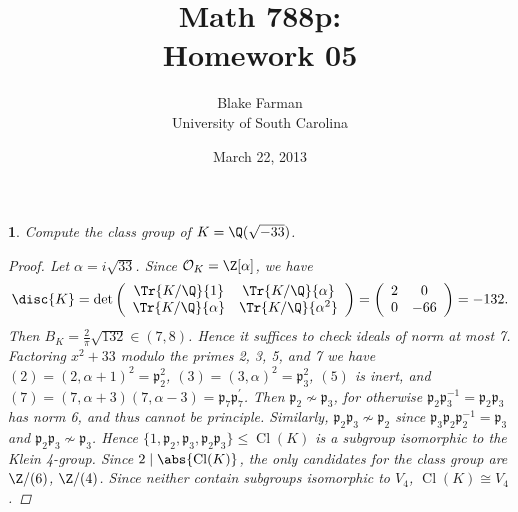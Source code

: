\documentclass[10pt]{amsart}
\author{Blake Farman\\University of South Carolina}
\title{Math 788p:\\Homework 05}
\date{March 22, 2013}
\begin{document}
\maketitle

\providecommand{\p}{\mathfrak{p}}
\providecommand{\m}{\mathfrak{m}}
\newcommand{\legendre}[2]{\left(\frac{#1}{#2}\right)}
\theoremstyle{plain}
\newtheorem{thm}{}
\newtheorem{lem}{Lemma}
\theoremstyle{definition}
\newtheorem{defn}{Definition}


\setcounter{thm}{2}
\begin{thm}
  Compute the class group of $K = \Q(\sqrt{-33})$.
  
  \begin{proof}
    Let $\alpha = i \sqrt{33}$.
    Since $\mathcal{O}_K = \Z[\alpha]$, we have
    $$\disc{K} = \operatorname{det}\left(\begin{array}{cc}
      \Tr{K/\Q}{1} & \Tr{K/\Q}{\alpha}\\
      \Tr{K/\Q}{\alpha} & \Tr{K/\Q}{\alpha^2}
    \end{array}
    \right)
    = 
    \left(\begin{array}{cc}
      2 & 0\\
      0 & -66
      \end{array}
    \right) = -132.$$
    Then $B_K = \frac{2}{\pi} \sqrt{132} \in (7, 8)$.
    Hence it suffices to check ideals of norm at most 7.
    Factoring $x^2 + 33$ modulo the primes 2, 3, 5, and 7 we have $(2) = (2, \alpha + 1)^2 = \mathfrak{p}_2^2$, $(3) = (3, \alpha)^2 = \mathfrak{p}_3^2$, $(5)$ is inert, and $(7) = (7, \alpha + 3)(7, \alpha -3) = \mathfrak{p}_7\mathfrak{p}_7^\prime$.
    Then $\p_2 \not \sim \p_3$, for otherwise $\p_2\p_3^{-1} = \p_2\p_3$ has norm 6, and thus cannot be principle.
    Similarly, $\p_2\p_3 \not \sim \p_2$ since $\p_3\p_2\p_2^{-1} = \p_3$ and $\p_2\p_3 \not \sim \p_3$.
    Hence $\{1, \p_2, \p_3, \p_2\p_3\} \leq \operatorname{Cl}(K)$ is a subgroup isomorphic to the Klein 4-group.
    Since $2 \mid \abs{\operatorname{Cl}(K)}$, the only candidates for the class group are $\Z/(6)$, $\Z/(4)$.
    Since neither contain subgroups isomorphic to $V_4$, $\operatorname{Cl}(K) \cong V_4$.
  \end{proof}
\end{thm}
\end{document}
